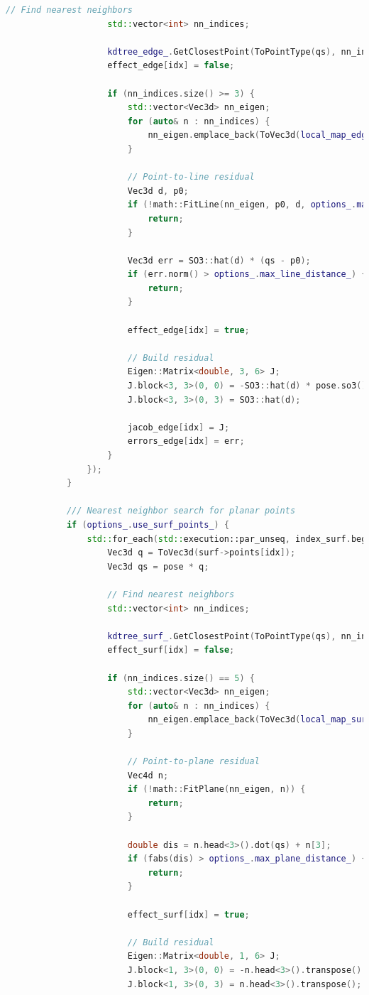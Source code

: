 \begin{lstlisting}[language=c++,caption=src/ch7/loam-like/loam\_like\_odom.cc]
					// Find nearest neighbors
					std::vector<int> nn_indices;
					
					kdtree_edge_.GetClosestPoint(ToPointType(qs), nn_indices, 5);
					effect_edge[idx] = false;
					
					if (nn_indices.size() >= 3) {
						std::vector<Vec3d> nn_eigen;
						for (auto& n : nn_indices) {
							nn_eigen.emplace_back(ToVec3d(local_map_edge_->points[n]));
						}
						
						// Point-to-line residual
						Vec3d d, p0;
						if (!math::FitLine(nn_eigen, p0, d, options_.max_line_distance_)) {
							return;
						}
						
						Vec3d err = SO3::hat(d) * (qs - p0);
						if (err.norm() > options_.max_line_distance_) {
							return;
						}
						
						effect_edge[idx] = true;
						
						// Build residual
						Eigen::Matrix<double, 3, 6> J;
						J.block<3, 3>(0, 0) = -SO3::hat(d) * pose.so3().matrix() * SO3::hat(q);
						J.block<3, 3>(0, 3) = SO3::hat(d);
						
						jacob_edge[idx] = J;
						errors_edge[idx] = err;
					}
				});
			}
			
			/// Nearest neighbor search for planar points
			if (options_.use_surf_points_) {
				std::for_each(std::execution::par_unseq, index_surf.begin(), index_surf.end(), [&](int idx) {
					Vec3d q = ToVec3d(surf->points[idx]);
					Vec3d qs = pose * q;
					
					// Find nearest neighbors
					std::vector<int> nn_indices;
					
					kdtree_surf_.GetClosestPoint(ToPointType(qs), nn_indices, 5);
					effect_surf[idx] = false;
					
					if (nn_indices.size() == 5) {
						std::vector<Vec3d> nn_eigen;
						for (auto& n : nn_indices) {
							nn_eigen.emplace_back(ToVec3d(local_map_surf_->points[n]));
						}
						
						// Point-to-plane residual
						Vec4d n;
						if (!math::FitPlane(nn_eigen, n)) {
							return;
						}
						
						double dis = n.head<3>().dot(qs) + n[3];
						if (fabs(dis) > options_.max_plane_distance_) {
							return;
						}
						
						effect_surf[idx] = true;
						
						// Build residual
						Eigen::Matrix<double, 1, 6> J;
						J.block<1, 3>(0, 0) = -n.head<3>().transpose() * pose.so3().matrix() * SO3::hat(q);
						J.block<1, 3>(0, 3) = n.head<3>().transpose();
						

\end{lstlisting}
